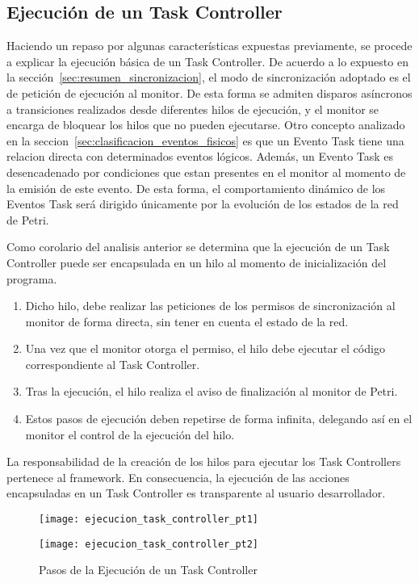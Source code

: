 \subsection{Ejecución de un Task Controller}
\label{sec:ejecucion_task_controller}
Haciendo un repaso por algunas características expuestas previamente, se procede
a explicar la ejecución básica de un Task Controller.
De acuerdo a lo expuesto en la sección~\ref{sec:resumen_sincronizacion}, el 
modo de sincronización adoptado es el de petición de ejecución al monitor. 
De esta forma se admiten disparos asíncronos a transiciones realizados desde
diferentes hilos de ejecución, y el monitor se encarga de bloquear los hilos que
no pueden ejecutarse.
Otro concepto analizado en la seccion~\ref{sec:clasificacion_eventos_fisicos}
es que un Evento Task tiene una
relacion directa con determinados eventos lógicos. Además, un Evento Task es
desencadenado por condiciones que estan presentes en el monitor al momento de
la emisión de este evento. De esta forma, el comportamiento dinámico de los
Eventos Task será dirigido únicamente por la evolución de los estados de la red
de Petri.

Como corolario del analisis anterior se determina que la ejecución de un Task
Controller puede ser encapsulada en un hilo al momento de inicialización del programa.
\begin{enumerate}
  \item Dicho hilo, debe realizar las peticiones de los permisos de sincronización al
  monitor de forma directa, sin tener en cuenta el estado de la red.
  \item  Una vez que el monitor otorga el permiso, el hilo debe ejecutar el
  código correspondiente al Task Controller.
  \item  Tras la ejecución, el hilo realiza el aviso de finalización al
  monitor de Petri.
  \item Estos pasos de ejecución deben repetirse de forma infinita, delegando así en el
  monitor el control de la ejecución del hilo.
\end{enumerate}

La responsabilidad de la creación de los hilos para ejecutar los Task
Controllers pertenece al framework. En consecuencia, la ejecución de las
acciones encapsuladas en un Task Controller es transparente al usuario
desarrollador.

\begin{figure}[H]
	\centering
	\texttt{[image: ejecucion\_task\_controller\_pt1]}
\end{figure}
\begin{figure}[H]
	\centering
	\texttt{[image: ejecucion\_task\_controller\_pt2]}
	\caption{Pasos de la Ejecución de un Task Controller}
	\label{fig:ejecucion_task_controller}
\end{figure}

